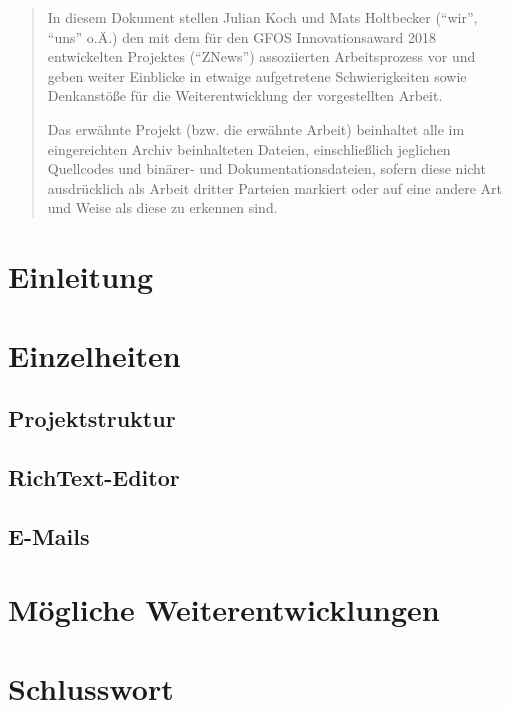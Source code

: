 

\newcommand*{\thetitle}{ZNews\\ Dokumentation}

\Begin

\begin{abstract}
    In diesem Dokument stellen Julian Koch und Mats Holtbecker
    (``wir'', ``uns'' o.Ä.)
    den mit dem für den GFOS Innovationsaward 2018 entwickelten Projektes (``ZNews'')
    assoziierten Arbeitsprozess vor
    und geben weiter Einblicke in etwaige aufgetretene Schwierigkeiten
    sowie Denkanstöße für die Weiterentwicklung der vorgestellten Arbeit.

    Das erwähnte Projekt (bzw. die erwähnte Arbeit)
    beinhaltet alle im eingereichten Archiv beinhalteten Dateien,
    einschließlich jeglichen Quellcodes und binärer- und Dokumentationsdateien,
    sofern diese nicht ausdrücklich als Arbeit dritter Parteien markiert
    oder auf eine andere Art und Weise als diese zu erkennen sind.
\end{abstract}

\newpage

\section{Einleitung}


\newpage

\section{Einzelheiten}

\subsection{Projektstruktur}


\subsection{RichText-Editor}


\subsection{E-Mails}


\newpage

\section{Mögliche Weiterentwicklungen}


\newpage

\section{Schlusswort}


\End
